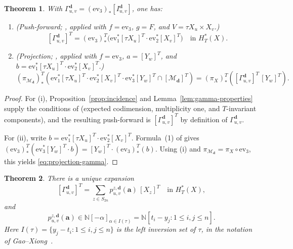 \documentclass[12pt]{amsart}
\newtheorem{theorem}{Theorem}[section]
\theoremstyle{definition}
\theoremstyle{remark}
\begin{document}
\begin{theorem}
\label{thm:mih-gysin-package}
With \(\Gamma_{u,v}^{\mathbf{d}}=(\mathrm{ev}_3)_*[I_{u,v}^{\mathbf{d}}]\), one has:
\begin{enumerate}
\item {\rm(Push-forward; \cite[Section~3.1, formula~(2)]{Mih}, applied with
\(f=\mathrm{ev}_3\), \(g=F\), and \(V=\tau X_u\times X_v\).)}
\begin{equation}
\label{eq:pushforward-gamma}
[\Gamma_{u,v}^{\mathbf{d}}]^T
=
(\mathrm{ev}_3)_*^T
\bigl(\mathrm{ev}_1^*[\tau X_u]^T\cdot
\mathrm{ev}_2^*[X_v]^T\bigr)
\quad\text{in }H_T^*(X).
\end{equation}
\item {\rm(Projection; \cite[Section~3.1, formula~(1)]{Mih}, applied with
\(f=\mathrm{ev}_3\), \(a=[Y_w]^T\), and
\(b=\mathrm{ev}_1^*[\tau X_u]^T\cdot\mathrm{ev}_2^*[X_v]^T\).)}
\begin{equation}
\label{eq:projection-gamma}
(\pi_{\mathcal{M}_{\mathbf{d}}})_*^T\left(\mathrm{ev}_1^*[\tau X_u]^T\cdot\mathrm{ev}_2^*[X_v]^T\cdot\mathrm{ev}_3^*[Y_w]^T\cap[\mathcal{M}_{\mathbf{d}}]^T\right)=
(\pi_X)_*^T\left([\Gamma_{u,v}^{\mathbf{d}}]^T\,[Y_w]^T\right).
\end{equation}
\end{enumerate}
\end{theorem}

\begin{proof}
For (i), Proposition~\ref{prop:incidence} and Lemma~\ref{lem:gamma-properties}
supply the conditions of \cite[Section~3.1, formula~(2)]{Mih}
(expected codimension, multiplicity one, and \(T\)-invariant components),
and the resulting push-forward is \([\Gamma_{u,v}^{\mathbf{d}}]^T\) by
definition of \(\Gamma_{u,v}^{\mathbf{d}}\).

For (ii), write \(b=\mathrm{ev}_1^*[\tau X_u]^T\cdot\mathrm{ev}_2^*[X_v]^T\).
Formula~(1) of \cite[Section~3.1]{Mih} gives
\((\mathrm{ev}_3)_*^T(\mathrm{ev}_3^*[Y_w]^T\cdot b)=[Y_w]^T\cdot(\mathrm{ev}_3)_*^T(b)\).
Using (i) and \(\pi_{\mathcal{M}_{\mathbf{d}}}=\pi_X\circ\mathrm{ev}_3\), this yields
\eqref{eq:projection-gamma}.
\end{proof}

\begin{theorem}
\label{thm:gamma-positivity}
There is a unique expansion
\begin{equation}
\label{eq:expansion-gamma}
[\Gamma_{u,v}^{\mathbf{d}}]^T
=
\sum_{z\in S_{2n}}
p_{u,v}^{z,\mathbf{d}}(\mathbf{a})\,[X_z]^T
\quad\text{in }H_T^*(X),
\end{equation}
and
\[
p_{u,v}^{z,\mathbf{d}}(\mathbf{a})
\in
\mathbb{N}[-\alpha]_{\alpha\in I(\tau)}
=
\mathbb{N}[t_i-y_j:1\le i,j\le n].
\]
Here \(I(\tau)=\{y_j-t_i:1\le i,j\le n\}\) is the left inversion set of
\(\tau\), in the notation of Gao--Xiong~\cite[Sections~2.1 and~2.3]{GX}.
\end{theorem}
\end{document}
